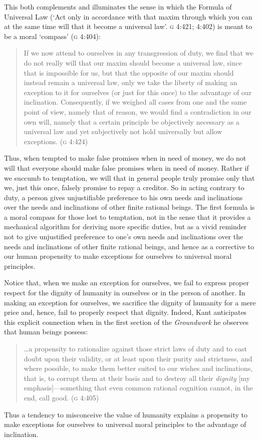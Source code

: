\documentclass[12pt]{article}
\begin{document}
This both complements and illuminates the sense in which the Formula of Universal Law (`Act only in accordance with that maxim through which you can at the same time will that it become a universal law'. \textsc{g} 4:421; 4:402) is meant to be a moral `compass' (\textsc{g} 4:404): 
\begin{quote}
	If we now attend to ourselves in any transgression of duty, we find that we do not really will that our maxim should become a universal law, since that is impossible for us, but that the opposite of our maxim should instead remain a universal law, only we take the liberty of making an exception to it for ourselves (or just for this once) to the advantage of our inclination. Consequently, if we weighed all cases from one and the same point of view, namely that of reason, we would find a contradiction in our own will, namely that a certain principle be objectively necessary as a universal law and yet subjectively not hold universally but allow exceptions. (\textsc{g} 4:424) 
\end{quote}
Thus, when tempted to make false promises when in need of money, we do not will that everyone should make false promises when in need of money. Rather if we succumb to temptation, we will that in general people truly promise only that we, just this once, falsely promise to repay a creditor. So in acting contrary to duty, a person gives unjustifiable preference to his own needs and inclinations over the needs and inclinations of other finite rational beings. The first formula is a moral compass for those lost to temptation, not in the sense that it provides a mechanical algorithm for deriving more specific duties, but as a vivid reminder not to give unjustified preference to one's own needs and inclinations over the needs and inclinations of other finite rational beings, and hence as a corrective to our human propensity to make exceptions for ourselves to universal moral principles. 

Notice that, when we make an exception for ourselves, we fail to express proper respect for the dignity of humanity in ourselves or in the person of another. In making an exception for ourselves, we sacrifice the dignity of humanity for a mere price and, hence, fail to properly respect that dignity. Indeed, Kant anticipates this explicit connection when in the first section of the \emph{Groundwork} he observes that human beings possess: 
\begin{quote}
	\ldots a propensity to rationalize against those strict laws of duty and to cast doubt upon their validity, or at least upon their purity and strictness, and where possible, to make them better suited to our wishes and inclinations, that is, to corrupt them at their basis and to destroy all their \emph{dignity} [my emphasis]---something that even common rational cognition cannot, in the end, call good. (\textsc{g} 4:405) 
\end{quote}
Thus a tendency to misconceive the value of humanity explains a propensity to make exceptions for ourselves to universal moral principles to the advantage of inclination.
\end{document}
